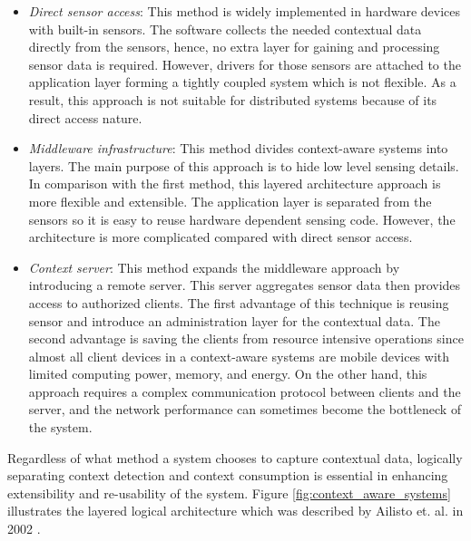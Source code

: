 \begin{itemize}
    \item \textit{Direct sensor access}: This method is widely implemented in hardware devices with built-in sensors. The software collects the needed contextual data directly from the sensors, hence, no extra layer for gaining and processing sensor data is required. However, drivers for those sensors are attached to the application layer forming a tightly coupled system which is not flexible. As a result, this approach is not suitable for distributed systems because of its direct access nature.
    \item \textit{Middleware infrastructure}: This method divides context-aware systems into layers. The main purpose of this approach is to hide low level sensing details. In comparison with the first method, this layered architecture approach is more flexible and extensible. The application layer is separated from the sensors so it is easy to reuse hardware dependent sensing code. However, the architecture is more complicated compared with direct sensor access.

    \item \textit{Context server}: This method expands the middleware approach by introducing a remote server. This server aggregates sensor data then provides access to authorized clients. The first advantage of this technique is reusing sensor and introduce an administration layer for the contextual data. The second advantage is saving the clients from resource intensive operations since almost all client devices in a context-aware systems are mobile devices with limited computing power, memory, and energy. On the other hand, this approach requires a complex communication protocol between clients and the server, and the network performance can sometimes become the bottleneck of the system.
\end{itemize}

Regardless of what method a system chooses to capture contextual data, logically separating context detection and context consumption is essential in enhancing extensibility and re-usability of the system. Figure \ref{fig:context_aware_systems} illustrates the layered logical architecture which was described by Ailisto et. al. in 2002 \cite{ailisto2002structuring}.

